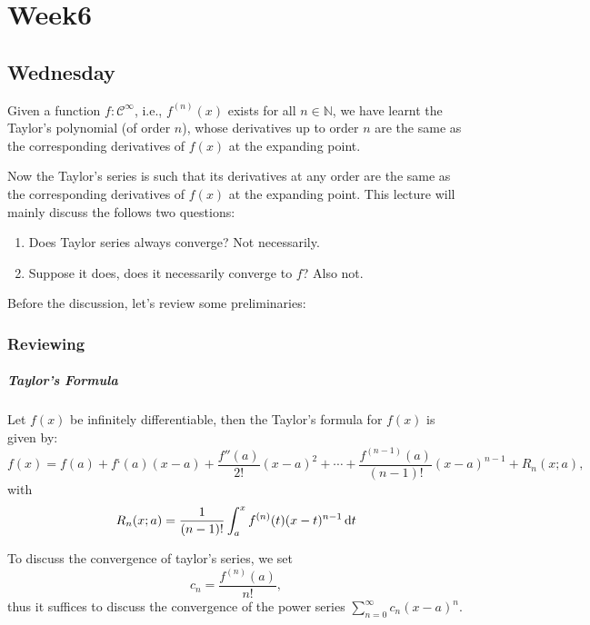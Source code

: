 \chapter{Week6}

\section{Wednesday}
Given a function $f:\mathcal{C}^\infty$, i.e., $f^{(n)}(x)$ exists for all $n\in\mathbb{N}$, we have learnt the Taylor's polynomial (of order $n$), whose derivatives up to order $n$ are the same as the corresponding derivatives of $f(x)$ at the expanding point.

Now the Taylor's series is such that its derivatives at any order are the same as the corresponding derivatives of $f(x)$ at the expanding point. This lecture will mainly discuss the follows two questions:
\begin{enumerate}
\item
Does Taylor series always converge? Not necessarily.
\item
Suppose it does, does it necessarily converge to $f$? Also not.
\end{enumerate}
Before the discussion, let's review some preliminaries:
\subsection{Reviewing}
\paragraph{Taylor's Formula}
\begin{theorem}
Let $f(x)$ be infinitely differentiable, then the Taylor's formula for $f(x)$ is given by:
\[
f(x)=f(a)+f‘(a)(x-a)+\frac{f''(a)}{2!}(x-a)^2+\cdots+\frac{f^{(n-1)}(a)}{(n-1)!}(x-a)^{n-1}+R_n(x;a),
\]
with
\[
R_n(x;a)=\frac{1}{(n-1)!}\int_a^xf^{(n)}(t)(x-t)^{n-1}\,\mathrm{d} t
\]
\end{theorem}
To discuss the convergence of taylor's series, we set
\[
c_n=\frac{f^{(n)}(a)}{n!},
\]
thus it suffices to discuss the convergence of the power series $\sum_{n=0}^\infty c_n(x-a)^n$.
